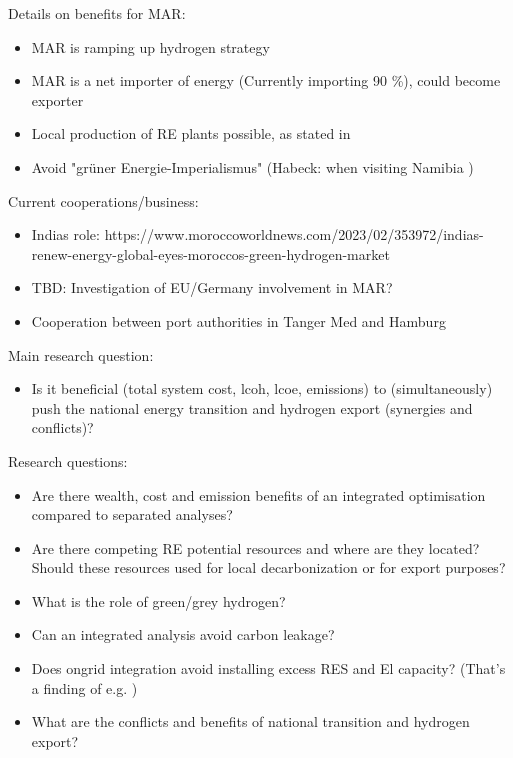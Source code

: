 Details on benefits for MAR:
\begin{itemize}
    \item MAR is ramping up hydrogen strategy
    \item MAR is a net importer of energy (Currently importing 90 \%), could become exporter
    \item Local production of RE plants possible, as stated in \cite{Ersoy2022}
    \item Avoid "gr{\"u}ner Energie-Imperialismus" (Habeck: when visiting Namibia ) \cite{HabeckEnergieimperialismus}
\end{itemize}

Current cooperations/business:
\begin{itemize}
    \item Indias role: https://www.moroccoworldnews.com/2023/02/353972/indias-renew-energy-global-eyes-moroccos-green-hydrogen-market
    \item TBD: Investigation of EU/Germany involvement in MAR?
    \item Cooperation between port authorities in Tanger Med and Hamburg
\end{itemize}

Main research question:
\begin{itemize}
    \item Is it beneficial (total system cost, lcoh, lcoe, emissions) to (simultaneously) push the national energy transition and hydrogen export (synergies and conflicts)?   
\end{itemize}

Research questions:
\begin{itemize}
    \item Are there wealth, cost and emission benefits of an integrated optimisation compared to separated analyses?
    \item Are there competing RE potential resources and where are they located? Should these resources used for local decarbonization or for export purposes?
    \item What is the role of green/grey hydrogen?   
    \item Can an integrated analysis avoid carbon leakage?
    \item Does ongrid integration avoid installing excess RES and El capacity? (That's a finding of e.g. \cite{Ruhnau2022})
    \item What are the conflicts and benefits of national transition and hydrogen export?
\end{itemize}

